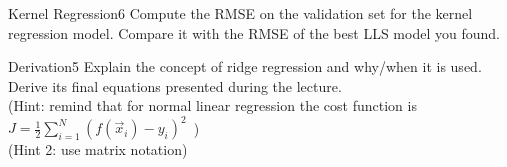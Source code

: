 \begin{questions}
\begin{question}{Kernel Regression}{6}
		Compute the RMSE on the validation set for the kernel regression model. Compare it with the RMSE of the best LLS model you found.
		
\begin{answer}\end{answer}
	\end{question}
	
	
	
	\begin{question}[bonus]{Derivation}{5}
		Explain the concept of ridge regression and why/when it is used.
		Derive its final equations presented during the lecture.\\
		(Hint: remind that for normal linear regression the cost function is $J = \frac{1}{2}\sum_{i=1}^N ( f(\vec x_i) - y_i ) ^2 \,$ )\\
		(Hint 2: use matrix notation)
		
\begin{answer}\end{answer}
	\end{question}	
	
\end{questions}

